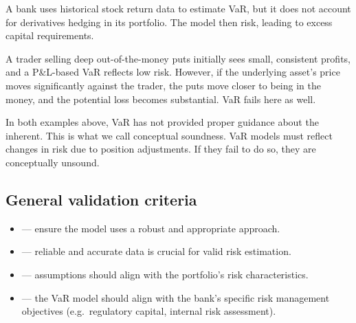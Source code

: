 
\begin{mrexbox}[title={Example 1}]
A bank uses historical stock return data to estimate VaR, but it does not account for
derivatives hedging in its portfolio. The model then  risk, leading to
excess capital requirements.
\end{mrexbox}

\begin{mrexbox}[title={Example 2}]
A trader selling deep out-of-the-money puts initially sees small, consistent profits, and a
P\&L-based VaR reflects low risk. However, if the underlying asset's price moves significantly
against the trader, the puts move closer to being in the money, and the potential loss becomes
substantial. VaR fails here as well.
\end{mrexbox}

\begin{mrdefbox}[title={Conceptual soundness}]
In both examples above, VaR has not provided proper guidance about the 
inherent. This is what we call conceptual soundness. VaR models must reflect changes in risk due
to position adjustments. If they fail to do so, they are conceptually unsound.
\end{mrdefbox}

\subsection{General validation criteria}
\begin{itemize}
\item {} --- ensure the model uses a robust and appropriate
      approach.
\item {} --- reliable and accurate data is crucial for valid
      risk estimation.
\item {} --- assumptions should align with the portfolio's risk
      characteristics.
\item {} --- the VaR model should align with the bank's specific risk
      management objectives (e.g.\ regulatory capital, internal risk assessment).
\end{itemize}

